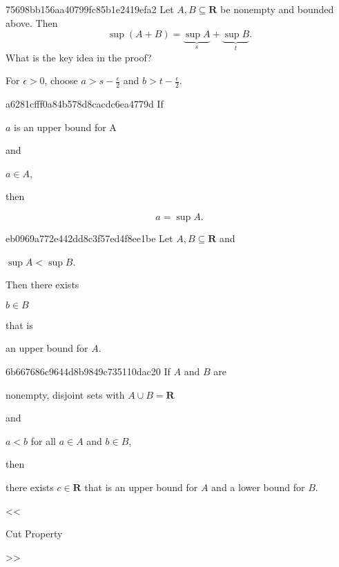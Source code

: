 \begin{note}{75698bb156aa40799fc85b1e2419efa2}
    Let \({ A, B \subseteq \mathbf{R} }\) be nonempty and bounded above.
    Then
    \[
        \sup (A + B) = \underbrace{\sup A}_{s} + \underbrace{\sup B}_{t}.
    \]
    What is the key idea in the proof?

    \begin{cloze}{1}
        For \({ \epsilon > 0 }\), choose \({ a > s - \frac{\epsilon}{2} }\) and \({ b > t - \frac{\epsilon}{2} }\).
    \end{cloze}
\end{note}

\begin{note}{a6281cfff0a84b578d8cacdc6ea4779d}
    If \begin{icloze}{3}\({ a }\) is an upper bound for A\end{icloze} and \begin{icloze}{2}\({ a \in A }\),\end{icloze} then
    \begin{icloze}{1}
        \[
            a = \sup A.
        \]
    \end{icloze}
\end{note}

\begin{note}{eb0969a772e442dd8c3f57ed4f8ee1be}
    Let \({ A, B \subseteq \mathbf{R} }\) and \begin{icloze}{3}\({ \sup A < \sup B }\).\end{icloze} Then there exists \begin{icloze}{2}\({ b \in B }\)\end{icloze} that is \begin{icloze}{1}an upper bound for \({ A }\).\end{icloze}
\end{note}

\begin{note}{6b667686c9644d8b9849c735110dac20}
    If \({ A }\) and \({ B }\) are \begin{icloze}{3}nonempty, disjoint sets with \({ A \cup B = \mathbf{R} }\)\end{icloze} and \begin{icloze}{2}\({ a < b  }\) for all \({ a \in A }\) and \({ b \in B }\),\end{icloze} then \begin{icloze}{1}there exists \({ c \in \mathbf{R} }\) that is an upper bound for \({ A }\) and a lower bound for \({ B }\).\end{icloze}

    \begin{center}
        \tiny
        <<\begin{icloze}{4}Cut Property\end{icloze}>>
    \end{center}
\end{note}

